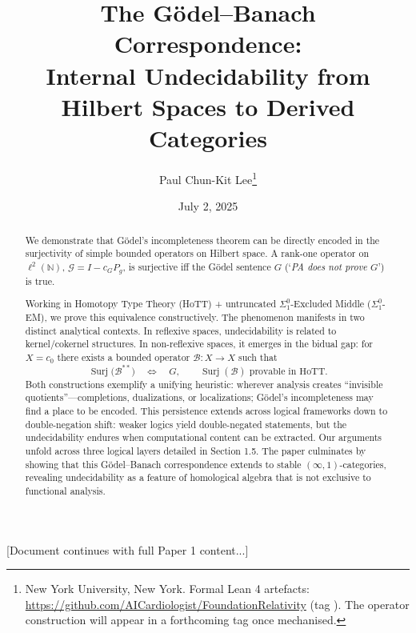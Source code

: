 \documentclass[11pt]{article}
\title{The Gödel--Banach Correspondence:\\
  Internal Undecidability from Hilbert Spaces to Derived Categories}
\author{Paul Chun-Kit Lee\thanks{New York University, New York.  Formal Lean 4 artefacts: \url{https://github.com/AICardiologist/FoundationRelativity}
(tag \leanRepoTag).  The operator construction will appear in a forthcoming tag once mechanised.  }}
\date{July 2, 2025}
\theoremstyle{definition}
\newcommand{\N}{\mathbb{N}}
\newcommand{\lp}{\ell^{2}(\N)}
\newcommand{\SigOne}{\Sigma^{0}_{\!1}}
\DeclareMathOperator{\Surj}{Surj}
\begin{document}
\maketitle

\begin{abstract}
\noindent
We demonstrate that Gödel's incompleteness theorem can be directly encoded in the surjectivity of simple bounded operators on Hilbert space. A rank-one operator on $\lp$, $\mathcal G = I - c_{G}P_{g}$, is surjective iff the Gödel sentence $G$ (`\emph{PA does not prove $G$}') is true.

Working in Homotopy Type Theory (HoTT) + untruncated $\SigOne$-Excluded Middle ($\SigOne$-EM), we prove this equivalence constructively. The phenomenon manifests in two distinct analytical contexts. In reflexive spaces, undecidability is related to kernel/cokernel structures. In non-reflexive spaces, it emerges in the bidual gap: for $X = c_{0}$ there exists a bounded operator $\mathcal B : X \to X$ such that
\[
  \Surj\bigl(\mathcal B^{**}\bigr) \quad\Longleftrightarrow\quad G,
  \qquad
  \Surj(\mathcal B) \text{ provable in HoTT.}
\]
Both constructions exemplify a unifying heuristic: wherever analysis creates ``invisible quotients''---completions, dualizations, or localizations; Gödel's incompleteness may find a place to be encoded. This persistence extends across logical frameworks down to double-negation shift: weaker logics yield double-negated statements, but the undecidability endures when computational content can be extracted. Our arguments unfold across three logical layers detailed in Section 1.5. The paper culminates by showing that this Gödel--Banach correspondence extends to stable $(\infty,1)$-categories, revealing undecidability as a feature of homological algebra that is not exclusive to functional analysis.
\end{abstract}

[Document continues with full Paper 1 content...]
\end{document}
